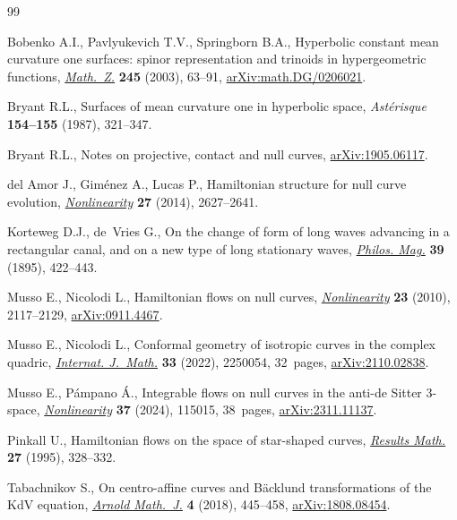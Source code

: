 \documentclass[10pt,a4paper]{amsart}
\numberwithin{equation}{section}
\begin{document}
\begin{thebibliography}{99}
\footnotesize\itemsep=0pt

Bobenko A.I., Pavlyukevich T.V., Springborn B.A., Hyperbolic constant mean
  curvature one surfaces: spinor representation and trinoids in hypergeometric
  functions, \href{https://doi.org/10.1007/s00209-003-0511-5}{\textit{Math.~Z.}} \textbf{245} (2003), 63--91,
  \href{https://arxiv.org/abs/math.DG/0206021}{arXiv:math.DG/0206021}.

Bryant R.L., Surfaces of mean curvature one in hyperbolic space,
  \textit{Ast\'erisque} \textbf{154--155} (1987), 321--347.

Bryant R.L., Notes on projective, contact and null curves, \href{https://arxiv.org/abs/1905.06117}{arXiv:1905.06117}.

del Amor J., Gim\'enez A., Lucas P., Hamiltonian structure for null curve
  evolution, \href{https://doi.org/10.1088/0951-7715/27/11/2627}{\textit{Nonlinearity}} \textbf{27} (2014), 2627--2641.

Korteweg D.J., de~Vries G., On the change of form of long waves advancing in a
  rectangular canal, and on a new type of long stationary waves,
  \href{https://doi.org/10.1080/14786449508620739}{\textit{Philos. Mag.}} \textbf{39} (1895), 422--443.

Musso E., Nicolodi L., Hamiltonian flows on null curves, \href{https://doi.org/10.1088/0951-7715/23/9/005}{\textit{Nonlinearity}}
  \textbf{23} (2010), 2117--2129, \href{https://arxiv.org/abs/0911.4467}{arXiv:0911.4467}.

Musso E., Nicolodi L., Conformal geometry of isotropic curves in the complex
  quadric, \href{https://doi.org/10.1142/S0129167X22500549}{\textit{Internat. J.~Math.}} \textbf{33} (2022), 2250054, 32~pages,
  \href{https://arxiv.org/abs/2110.02838}{arXiv:2110.02838}.

Musso E., P\'ampano {\'A}., Integrable flows on null curves in the anti-de
  {S}itter 3-space, \href{https://doi.org/10.1088/1361-6544/ad7d58}{\textit{Nonlinearity}} \textbf{37} (2024), 115015, 38~pages,
  \href{https://arxiv.org/abs/2311.11137}{arXiv:2311.11137}.

Pinkall U., Hamiltonian flows on the space of star-shaped curves,
  \href{https://doi.org/10.1007/BF03322836}{\textit{Results Math.}} \textbf{27} (1995), 328--332.

Tabachnikov S., On centro-affine curves and {B}\"acklund transformations of the
  {K}d{V} equation, \href{https://doi.org/10.1007/s40598-019-00105-y}{\textit{Arnold Math.~J.}} \textbf{4} (2018), 445--458,
  \href{https://arxiv.org/abs/1808.08454}{arXiv:1808.08454}.


\end{thebibliography}
\end{document}
